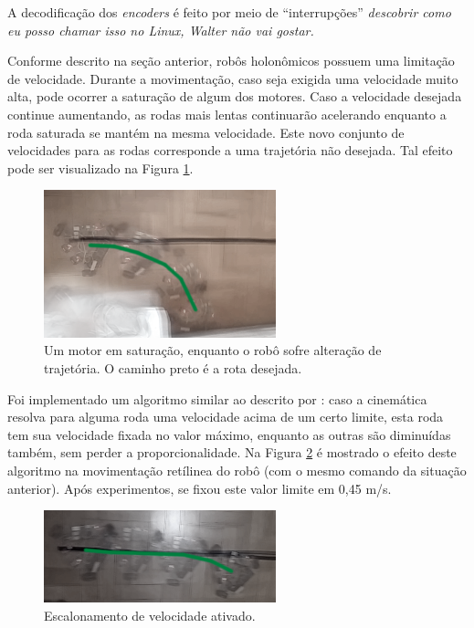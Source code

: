 A decodificação dos \textit{encoders} é feito por meio de ``interrupções'' \textit{descobrir como eu posso chamar isso no Linux, Walter não vai gostar.}

Conforme descrito na seção anterior, robôs holonômicos possuem uma limitação de velocidade. Durante a movimentação, caso seja exigida uma velocidade muito alta, pode ocorrer a saturação de algum dos motores. Caso a velocidade desejada continue aumentando, as rodas mais lentas continuarão acelerando enquanto a roda saturada se mantém na mesma velocidade. Este novo conjunto de velocidades para as rodas corresponde a uma trajetória não desejada. Tal efeito pode ser visualizado na Figura \ref{fig:scaling_off}.

\begin{figure}[h]
  \centering
  \includegraphics[width = 0.6\textwidth]{imagens/scaling_off}
  \caption{Um motor em saturação, enquanto o robô sofre alteração de trajetória. O caminho preto é a rota desejada.}
  \label{fig:scaling_off}
\end{figure}

Foi implementado um algoritmo similar ao descrito por \citet{indiveri2009swedish}: caso a cinemática resolva para alguma roda uma velocidade acima de um certo limite, esta roda tem sua velocidade fixada no valor máximo, enquanto as outras são diminuídas também, sem perder a proporcionalidade. Na Figura \ref{fig:scaling_on} é mostrado o efeito deste algoritmo na movimentação retílinea do robô (com o mesmo comando da situação anterior). Após experimentos, se fixou este valor limite em 0,45 m/s.

\begin{figure}[h]
  \centering
  \includegraphics[width = 0.6\textwidth]{imagens/scaling_on}
  \caption{Escalonamento de velocidade ativado.}
  \label{fig:scaling_on}
\end{figure}

